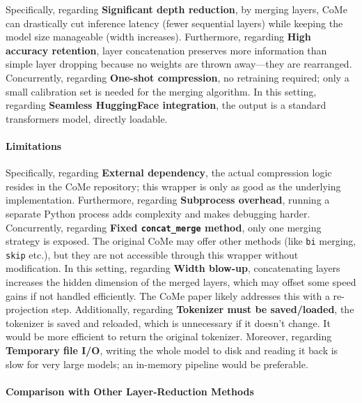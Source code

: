 Specifically, regarding \textbf{Significant depth reduction}, by merging layers, CoMe can drastically cut inference latency (fewer sequential layers) while keeping the model size manageable (width increases). Furthermore, regarding \textbf{High accuracy retention}, layer concatenation preserves more information than simple layer dropping because no weights are thrown away---they are rearranged. Concurrently, regarding \textbf{One-shot compression}, no retraining required; only a small calibration set is needed for the merging algorithm. In this setting, regarding \textbf{Seamless HuggingFace integration}, the output is a standard transformers model, directly loadable.


\paragraph{Limitations}

Specifically, regarding \textbf{External dependency}, the actual compression logic resides in the CoMe repository; this wrapper is only as good as the underlying implementation. Furthermore, regarding \textbf{Subprocess overhead}, running a separate Python process adds complexity and makes debugging harder. Concurrently, regarding \textbf{Fixed \texttt{concat\_merge} method}, only one merging strategy is exposed. The original CoMe may offer other methods (like \texttt{bi} merging, \texttt{skip} etc.), but they are not accessible through this wrapper without modification. In this setting, regarding \textbf{Width blow-up}, concatenating layers increases the hidden dimension of the merged layers, which may offset some speed gains if not handled efficiently. The CoMe paper likely addresses this with a re-projection step. Additionally, regarding \textbf{Tokenizer must be saved/loaded}, the tokenizer is saved and reloaded, which is unnecessary if it doesn't change. It would be more efficient to return the original tokenizer. Moreover, regarding \textbf{Temporary file I/O}, writing the whole model to disk and reading it back is slow for very large models; an in-memory pipeline would be preferable.


\paragraph{Comparison with Other Layer-Reduction Methods}

